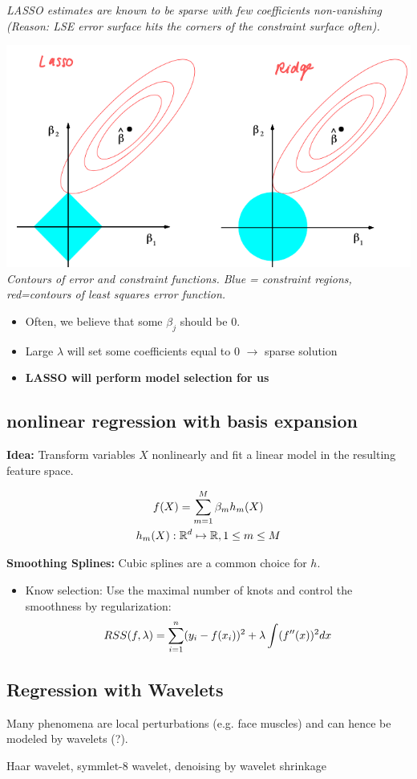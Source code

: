 \textit{LASSO estimates are known to be sparse with few coefficients non-vanishing (Reason: LSE error surface hits the corners of the constraint surface often).
}
\begin{center}
	\includegraphics[width=0.8\columnwidth]{images/4-ridge-vs-lasso}\\
	\textit{Contours of error and constraint functions. Blue = constraint regions, red=contours of least squares error function.}
\end{center}
\begin{itemize}
	\item Often, we believe that some $\beta_j$ should be $0$.
	\item Large $\lambda$ will set some coefficients equal to $0$ $\to$ sparse solution
	\item \textbf{LASSO will perform model selection for us}
\end{itemize}


\subsection{nonlinear regression with basis expansion}
\textbf{Idea: } Transform variables $X$ nonlinearly and fit a linear model in the resulting feature space.

\begin{equation*}
	\begin{gathered}			
		f(X) = \sum_{m=1}^M \beta_mh_m(X) \\
		h_m(X) : \mathbb R^d\mapsto \mathbb R, 1\leq m \leq M
	\end{gathered}
\end{equation*}

\textbf{Smoothing Splines:}	
Cubic splines are a common choice for $h$.
\begin{itemize}
	\item Know selection: Use the maximal number of knots and control the smoothness by regularization:
	$$
		RSS(f, \lambda) = \sum_{i = 1}^{n}(y_i - f(x_i))^2 + \lambda\int(f''(x))^2 dx
	$$
\end{itemize}

\subsection{Regression with Wavelets}
Many phenomena are local perturbations (e.g. face muscles) and can hence be modeled by wavelets (?).

Haar wavelet, symmlet-8 wavelet, denoising by wavelet shrinkage
